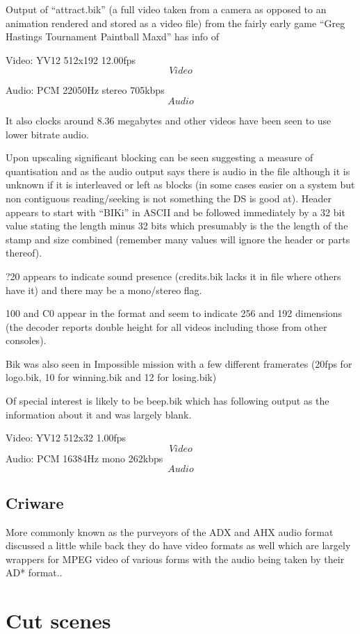 \documentclass[
]{book}
\begin{document}
Output of ``attract.bik'' (a full video taken from a camera as opposed to an animation rendered and stored as a video file) from the fairly early game ``Greg Hastings Tournament Paintball Maxd'' has info of

Video: YV12 512x192 12.00fps \[Video\]

Audio: PCM 22050Hz stereo 705kbps \[Audio\]

It also clocks around 8.36 megabytes and other videos have been seen to use lower bitrate audio.

Upon upscaling significant blocking can be seen suggesting a measure of quantisation and as the audio output says there is audio in the file although it is unknown if it is interleaved or left as blocks (in some cases easier on a system but non contiguous reading/seeking is not something the DS is good at). Header appears to start with ``BIKi'' in ASCII and be followed immediately by a 32 bit value stating the length minus 32 bits which presumably is the the length of the stamp and size combined (remember many values will ignore the header or parts thereof).

?20 appears to indicate sound presence (credits.bik lacks it in file where others have it) and there may be a mono/stereo flag.

100 and C0 appear in the format and seem to indicate 256 and 192 dimensions (the decoder reports double height for all videos including those from other consoles).

Bik was also seen in Impossible mission with a few different framerates (20fps for logo.bik, 10 for winning.bik and 12 for losing.bik)

Of special interest is likely to be beep.bik which has following output as the information about it and was largely blank.

Video: YV12 512x32 1.00fps \[Video\] Audio: PCM 16384Hz mono 262kbps \[Audio\]

\hypertarget{criware}{%
\subsection{Criware}\label{criware}}

More commonly known as the purveyors of the ADX and AHX audio format discussed a little while back they do have video formats as well which are largely wrappers for MPEG video of various forms with the audio being taken by their AD* format..

\hypertarget{cut-scenes}{%
\section{Cut scenes}\label{cut-scenes}}
\end{document}
